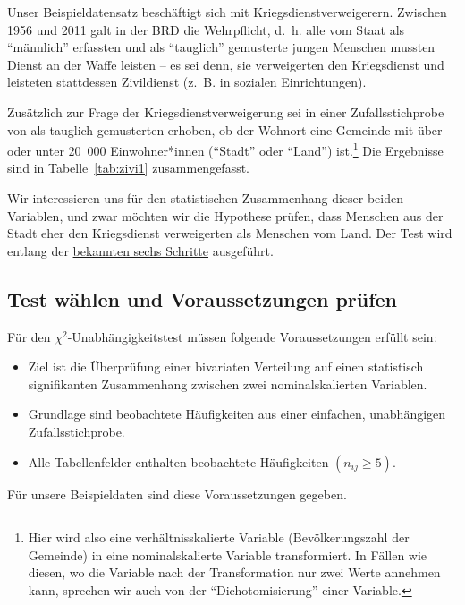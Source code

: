 \documentclass[
  11pt,
  ngerman,
  a4paper,
]{report}
\providecommand{\tightlist}{%
  \setlength{\itemsep}{0pt}\setlength{\parskip}{0pt}}
\begin{document}
Unser Beispieldatensatz beschäftigt sich mit Kriegsdienstverweigerern. Zwischen 1956 und 2011 galt in der BRD die Wehrpflicht, d.~h. alle vom Staat als \enquote{männlich} erfassten und als \enquote{tauglich} gemusterte jungen Menschen mussten Dienst an der Waffe leisten -- es sei denn, sie verweigerten den Kriegsdienst und leisteten stattdessen Zivildienst (z.~B. in sozialen Einrichtungen).

Zusätzlich zur Frage der Kriegsdienstverweigerung sei in einer Zufallsstichprobe von als tauglich gemusterten erhoben, ob der Wohnort eine Gemeinde mit über oder unter 20~000 Einwohner*innen (\enquote{Stadt} oder \enquote{Land}) ist.\footnote{Hier wird also eine verhältnisskalierte Variable (Bevölkerungszahl der Gemeinde) in eine nominalskalierte Variable transformiert. In Fällen wie diesen, wo die Variable nach der Transformation nur zwei Werte annehmen kann, sprechen wir auch von der \enquote{Dichotomisierung} einer Variable.} Die Ergebnisse sind in Tabelle~\ref{tab:zivi1} zusammengefasst.

Wir interessieren uns für den statistischen Zusammenhang dieser beiden Variablen, und zwar möchten wir die Hypothese prüfen, dass Menschen aus der Stadt eher den Kriegsdienst verweigerten als Menschen vom Land. Der Test wird entlang der \protect\hyperlink{statistische-tests}{bekannten sechs Schritte} ausgeführt.

\hypertarget{test-wuxe4hlen-und-voraussetzungen-pruxfcfen-4}{%
\subsection{Test wählen und Voraussetzungen prüfen}\label{test-wuxe4hlen-und-voraussetzungen-pruxfcfen-4}}

Für den \(\chi^2\)-Unabhängigkeitstest müssen folgende Voraussetzungen erfüllt sein:

\begin{itemize}
\tightlist
\item
  Ziel ist die Überprüfung einer bivariaten Verteilung auf einen statistisch signifikanten Zusammenhang zwischen zwei nominalskalierten Variablen.
\item
  Grundlage sind beobachtete Häufigkeiten aus einer einfachen, unabhängigen Zufallsstichprobe.
\item
  Alle Tabellenfelder enthalten beobachtete Häufigkeiten \((n_{ij}\geq 5)\).
\end{itemize}

Für unsere Beispieldaten sind diese Voraussetzungen gegeben.
\end{document}
